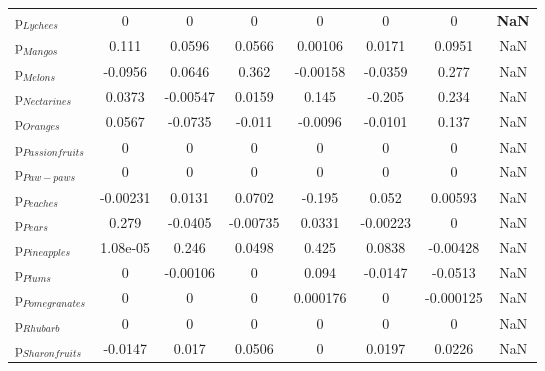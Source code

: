 \documentclass[11pt]{article}
\begin{document}
\begin{table}[h]
\begin{center}
\begin{tabular}{lccccccc}
p$_{Lychees}$ &0 &0 &0 &0 &0 &0 &\textbf{NaN} \\
p$_{Mangos}$ &0.111 &0.0596 &0.0566 &0.00106 &0.0171 &0.0951 &NaN \\
p$_{Melons}$ &-0.0956 &0.0646 &0.362 &-0.00158 &-0.0359 &0.277 &NaN \\
p$_{Nectarines}$ &0.0373 &-0.00547 &0.0159 &0.145 &-0.205 &0.234 &NaN \\
p$_{Oranges}$ &0.0567 &-0.0735 &-0.011 &-0.0096 &-0.0101 &0.137 &NaN \\
p$_{Passion fruits}$ &0 &0 &0 &0 &0 &0 &NaN \\
p$_{Paw-paws}$ &0 &0 &0 &0 &0 &0 &NaN \\
p$_{Peaches}$ &-0.00231 &0.0131 &0.0702 &-0.195 &0.052 &0.00593 &NaN \\
p$_{Pears}$ &0.279 &-0.0405 &-0.00735 &0.0331 &-0.00223 &0 &NaN \\
p$_{Pineapples}$ &1.08e-05 &0.246 &0.0498 &0.425 &0.0838 &-0.00428 &NaN \\
p$_{Plums}$ &0 &-0.00106 &0 &0.094 &-0.0147 &-0.0513 &NaN \\
p$_{Pomegranates}$ &0 &0 &0 &0.000176 &0 &-0.000125 &NaN \\
p$_{Rhubarb}$ &0 &0 &0 &0 &0 &0 &NaN \\
p$_{Sharon fruits}$ &-0.0147 &0.017 &0.0506 &0 &0.0197 &0.0226 &NaN \\
\end{tabular}
\end{center}
\end{table}
\end{document}
